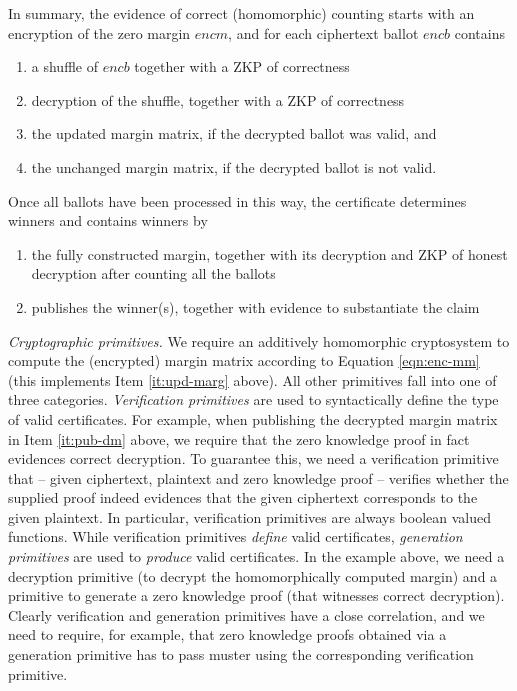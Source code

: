 In summary, the evidence of correct (homomorphic) counting starts
with an encryption of the zero margin $encm$, and for each
ciphertext ballot $encb$ contains
\begin{enumerate}
\item \label{it:shuff} a shuffle of $encb$ together with a ZKP of 
correctness
\item decryption of the  shuffle, together with a ZKP of
correctness
\item \label{it:upd-marg} the updated margin matrix, if the decrypted ballot
was valid, and
\item the unchanged margin matrix, if the decrypted
ballot is not valid.
\setcounter{mycnt}{\value{enumi}}
\end{enumerate}
Once all ballots have been processed in this way, the certificate
determines winners and contains
winners by
\begin{enumerate}
\setcounter{enumi}{\value{mycnt}}
\item \label{it:pub-dm} the fully constructed margin, together with its decryption  
  and ZKP of honest decryption after counting all the ballots     
\item publishes the winner(s), together with evidence to substantiate the
    claim
\end{enumerate}

\smallskip\noindent\emph{Cryptographic primitives.}
We require an additively homomorphic cryptosystem to
compute the (encrypted) margin matrix according to Equation
\ref{eqn:enc-mm} (this implements Item \ref{it:upd-marg} above). All
other primitives fall into one of three categories.
\emph{Verification primitives} are used to syntactically define
the type of valid certificates. For example, when publishing the
decrypted margin matrix in Item \ref{it:pub-dm} above, we require
that the zero knowledge proof in fact evidences correct decryption.
To
guarantee this, we need a verification primitive that -- given
ciphertext, plaintext and zero knowledge proof -- verifies whether the supplied proof
indeed evidences that the given ciphertext corresponds to the given
plaintext. In particular, verification primitives are always boolean
valued functions. While verification primitives \emph{define} valid
certificates, \emph{generation primitives} are used to
\emph{produce} valid certificates. In the example above, we need a
decryption primitive (to decrypt the homomorphically computed
margin) and a primitive to generate a zero knowledge proof (that
witnesses correct decryption). Clearly verification and generation
primitives have a close correlation, and we need to require, for
example, that zero knowledge proofs obtained via a generation
primitive has to pass muster using the corresponding verification
primitive. 

